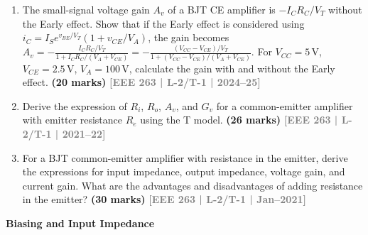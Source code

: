 \documentclass[12pt,a3paper]{article}
\newcommand{\yr}[1]{\hfill\textcolor{gray}{\small\textbf{[#1]}}}
\newcommand{\mk}[1]{\textcolor{orange!70!black}{\small\textbf{(#1 marks)}}}
\newcommand{\subtopic}[2]{%
  \vspace{10pt}
  \noindent\begin{tcolorbox}[colback=#1!8,colframe=#1,boxrule=0.6pt,arc=4pt,
    left=6pt,right=6pt,top=4pt,bottom=4pt]
    \small\bfseries\textcolor{#1}{#2}
  \end{tcolorbox}
  \vspace{2pt}
}
\begin{document}
\begin{enumerate}
\begin{center}
\begin{circuitikz}[thick,american, scale=1.2]
\end{circuitikz}
\end{center}
\mk{23.67} \yr{EEE 263 | L-2/T-1 | 2018--19}

\item The small-signal voltage gain $A_v$ of a BJT CE amplifier is $-I_C R_C / V_T$ without the Early effect. Show that if the Early effect is considered using $i_C = I_S e^{v_{BE}/V_T}(1 + v_{CE}/V_A)$, the gain becomes $A_v = -\frac{I_C R_C / V_T}{1 + I_C R_C/(V_A + V_{CE})} = -\frac{(V_{CC}-V_{CE})/V_T}{1 + (V_{CC}-V_{CE})/(V_A+V_{CE})}$. For $V_{CC}=5\,\text{V}$, $V_{CE}=2.5\,\text{V}$, $V_A=100\,\text{V}$, calculate the gain with and without the Early effect.
\mk{20} \yr{EEE 263 | L-2/T-1 | 2024--25}

\item Derive the expression of $R_i$, $R_o$, $A_v$, and $G_v$ for a common-emitter amplifier with emitter resistance $R_e$ using the T model.
\mk{26} \yr{EEE 263 | L-2/T-1 | 2021--22}

\item For a BJT common-emitter amplifier with resistance in the emitter, derive the expressions for input impedance, output impedance, voltage gain, and current gain. What are the advantages and disadvantages of adding resistance in the emitter?
\mk{30} \yr{EEE 263 | L-2/T-1 | Jan--2021}

\end{enumerate}

\subtopic{cC}{Biasing and Input Impedance}
\label{sub:s5-biasimpedance}
\end{document}
